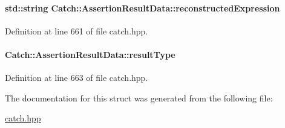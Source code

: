 \paragraph[{reconstructed\+Expression}]{\setlength{\rightskip}{0pt plus 5cm}std\+::string Catch\+::\+Assertion\+Result\+Data\+::reconstructed\+Expression}\label{a00006_a9e809d36fffbeb1c7d0cbe7382dd9595}


Definition at line 661 of file catch.\+hpp.

\hypertarget{a00006_a7ceab4a7ff722aec5587e3748caf66b7}{}
\paragraph[{result\+Type}]{ Catch\+::\+Assertion\+Result\+Data\+::result\+Type}\label{a00006_a7ceab4a7ff722aec5587e3748caf66b7}


Definition at line 663 of file catch.\+hpp.



The documentation for this struct was generated from the following file\+:\begin{DoxyCompactItemize}
\item 
\hyperlink{a00094}{catch.\+hpp}\end{DoxyCompactItemize}
